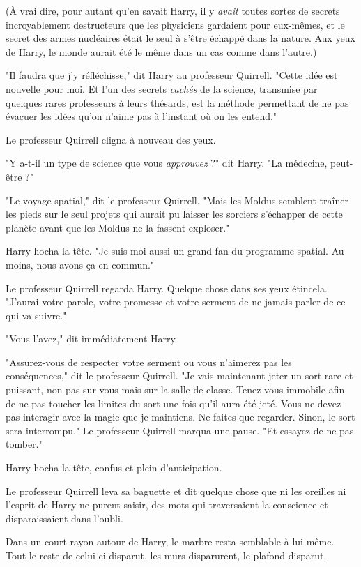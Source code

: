 (À vrai dire, pour autant qu'en savait Harry, il y \emph{avait}  toutes sortes de secrets incroyablement destructeurs que les physiciens gardaient pour eux-mêmes, et le secret des armes nucléaires était le seul à s'être échappé dans la nature. Aux yeux de Harry, le monde aurait été le même dans un cas comme dans l'autre.)

"Il faudra que j'y réfléchisse," dit Harry au professeur Quirrell. "Cette idée est nouvelle pour moi. Et l'un des secrets \emph{cachés}  de la science, transmise par quelques rares professeurs à leurs thésards, est la méthode permettant de ne pas évacuer les idées qu'on n'aime pas à l'instant où on les entend."

Le professeur Quirrell cligna à nouveau des yeux.

"Y a-t-il un type de science que vous \emph{approuvez}  ?" dit Harry. "La médecine, peut-être ?"

"Le voyage spatial," dit le professeur Quirrell. "Mais les Moldus semblent traîner les pieds sur le seul projets qui aurait pu laisser les sorciers s'échapper de cette planète avant que les Moldus ne la fassent exploser."

Harry hocha la tête. "Je suis moi aussi un grand fan du programme spatial. Au moins, nous avons ça en commun."

Le professeur Quirrell regarda Harry. Quelque chose dans ses yeux étincela. "J'aurai votre parole, votre promesse et votre serment de ne jamais parler de ce qui va suivre."

"Vous l'avez," dit immédiatement Harry.

"Assurez-vous de respecter votre serment ou vous n'aimerez pas les conséquences," dit le professeur Quirrell. "Je vais maintenant jeter un sort rare et puissant, non pas sur vous mais sur la salle de classe. Tenez-vous immobile afin de ne pas toucher les limites du sort une fois qu'il aura été jeté. Vous ne devez pas interagir avec la magie que je maintiens. Ne faites que regarder. Sinon, le sort sera interrompu." Le professeur Quirrell marqua une pause. "Et essayez de ne pas tomber."

Harry hocha la tête, confus et plein d'anticipation.

Le professeur Quirrell leva sa baguette et dit quelque chose que ni les oreilles ni l'esprit de Harry ne purent saisir, des mots qui traversaient la conscience et disparaissaient dans l'oubli.

Dans un court rayon autour de Harry, le marbre resta semblable à lui-même. Tout le reste de celui-ci disparut, les murs disparurent, le plafond disparut.

